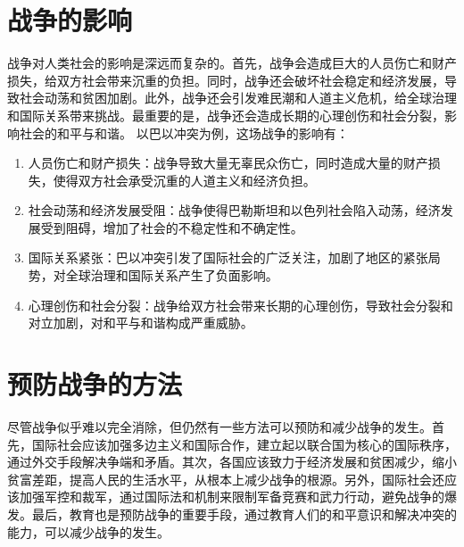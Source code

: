 \documentclass{ctexart}
\begin{document}
\section{战争的影响}
战争对人类社会的影响是深远而复杂的。首先，战争会造成巨大的人员伤亡和财产损失，给双方社会带来沉重的负担。同时，战争还会破坏社会稳定和经济发展，导致社会动荡和贫困加剧。此外，战争还会引发难民潮和人道主义危机，给全球治理和国际关系带来挑战。最重要的是，战争还会造成长期的心理创伤和社会分裂，影响社会的和平与和谐。
以巴以冲突为例，这场战争的影响有：
\begin{enumerate}
  \item 人员伤亡和财产损失：战争导致大量无辜民众伤亡，同时造成大量的财产损失，使得双方社会承受沉重的人道主义和经济负担。

  \item 社会动荡和经济发展受阻：战争使得巴勒斯坦和以色列社会陷入动荡，经济发展受到阻碍，增加了社会的不稳定性和不确定性。

  \item 国际关系紧张：巴以冲突引发了国际社会的广泛关注，加剧了地区的紧张局势，对全球治理和国际关系产生了负面影响。

  \item 心理创伤和社会分裂：战争给双方社会带来长期的心理创伤，导致社会分裂和对立加剧，对和平与和谐构成严重威胁。

\end{enumerate}
\section{预防战争的方法}
尽管战争似乎难以完全消除，但仍然有一些方法可以预防和减少战争的发生。首先，国际社会应该加强多边主义和国际合作，建立起以联合国为核心的国际秩序，通过外交手段解决争端和矛盾。其次，各国应该致力于经济发展和贫困减少，缩小贫富差距，提高人民的生活水平，从根本上减少战争的根源。另外，国际社会还应该加强军控和裁军，通过国际法和机制来限制军备竞赛和武力行动，避免战争的爆发。最后，教育也是预防战争的重要手段，通过教育人们的和平意识和解决冲突的能力，可以减少战争的发生。
\end{document}
